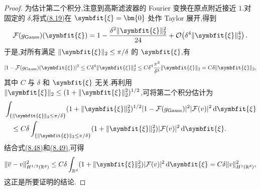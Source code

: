 \begin{proof}
为估计第二个积分,注意到高斯滤波器的 Fourier 变换在原点附近接近 $1$.对固定的 $\delta$,将式\hyperref[eq:gaussian-filter-fourier]{(8.19)}在 $\symbfit{\xi}=\bm{0}$ 处作 Taylor 展开,得到
\[
 \mathcal{F}(g_{\mathrm{Gauss}})(\symbfit{\xi})
  =1-\frac{\delta^2\|\symbfit{\xi}\|_2^2}{24}
    +\mathcal{O}\!\left(\delta^4\|\symbfit{\xi}\|_2^4\right).
\]
于是,对所有满足 $\|\symbfit{\xi}\|_2\le\pi/\delta$ 的 $\symbfit{\xi}$,有
\[
 |1-\mathcal{F}(g_{\mathrm{Gauss}})(\symbfit{\xi})|^2
  \le C\delta^4\|\symbfit{\xi}\|_2^4
  \le C\delta^4\frac{\pi^3}{\delta^3}\|\symbfit{\xi}\|_2
  =C\delta\|\symbfit{\xi}\|_2,
\]
其中 $C$ 与 $\delta$ 和 $\symbfit{\xi}$ 无关.再利用
$\|\symbfit{\xi}\|_2\le(1+\|\symbfit{\xi}\|_2^2)^{1/2}$,可将第二个积分估计为
\begin{equation}\label{eq:gaussian-filter-Hhalf-low-freq}
\begin{aligned}
 &\int_{\{\|\symbfit{\xi}\|_2\le\pi/\delta\}}
    (1+\|\symbfit{\xi}\|_2^2)^{1/2}
    |1-\mathcal{F}(g_{\mathrm{Gauss}})|^2|\mathcal{F}(v)|^2
    \,\mathrm{d}\symbfit{\xi}\\
 &\quad\le C\delta
   \int_{\{\|\symbfit{\xi}\|_2\le\pi/\delta\}}
     (1+\|\symbfit{\xi}\|_2^2)|\mathcal{F}(v)|^2
     \,\mathrm{d}\symbfit{\xi}.
\end{aligned}
\end{equation}
结合式\hyperref[eq:gaussian-filter-Hhalf-high-freq]{(8.48)}和\hyperref[eq:gaussian-filter-Hhalf-low-freq]{(8.49)},可得
\[
 \|\overline{v}-v\|_{H^{1/2}(\mathbb{R}^d)}^2
  \le C\delta\int_{\mathbb{R}^d}
       (1+\|\symbfit{\xi}\|_2^2)|\mathcal{F}(v)|^2\,
       \mathrm{d}\symbfit{\xi}
  =C\delta\|v\|_{H^1(\mathbb{R}^d)}^2,
\]
这正是所要证明的结论.
\end{proof}

